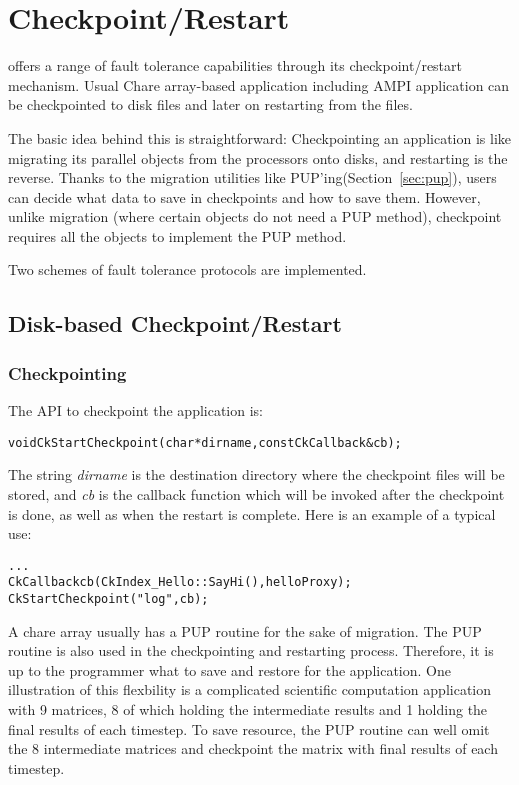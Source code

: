 \section{Checkpoint/Restart}

\label{sec:checkpoint}

\charmpp{} offers a range of fault tolerance capabilities through its 
checkpoint/restart mechanism. Usual Chare array-based \charmpp{} application 
including AMPI application can be checkpointed to disk files and later 
on restarting from the files.

The basic idea behind this is straightforward: Checkpointing an 
application is like migrating its parallel objects from the processors
onto disks, and restarting is the reverse. Thanks to the migration 
utilities like PUP'ing(Section~\ref{sec:pup}), users can decide what 
data to save in checkpoints and how to save them. However, unlike migration (where certain objects do not need a PUP method), checkpoint requires all the objects to implement the PUP method.

Two schemes of fault tolerance protocols are implemented.

\subsection{Disk-based Checkpoint/Restart}

\subsubsection{Checkpointing}

\label{sec:diskcheckpoint}
	The API to checkpoint the application is:

\begin{alltt} 
  void CkStartCheckpoint(char* dirname,const CkCallback& cb);
\end{alltt}

The string {\it dirname} is the destination directory where the checkpoint
files will be stored, and {\it cb} is the callback function which will be
invoked after the checkpoint is done, as well as when the restart is
complete. Here is an example of a typical use:

\begin{alltt} 
  . . .
  CkCallback cb(CkIndex_Hello::SayHi(),helloProxy);
  CkStartCheckpoint("log",cb);
\end{alltt}

A chare array usually has a PUP routine for the sake of migration. 
The PUP routine is also used in the checkpointing and restarting process.
Therefore, it is up to the programmer what to save and restore for
the application. One illustration of this flexbility is a complicated
scientific computation application with 9 matrices, 8 of which holding 
the intermediate results and 1 holding the final results of each timestep.
To save resource, the PUP routine can well omit the 8 intermediate matrices
and checkpoint the matrix with final results of each timestep. 

